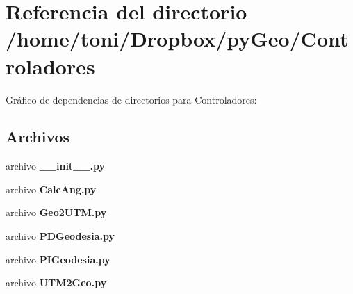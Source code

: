 \section{Referencia del directorio /home/toni/\-Dropbox/py\-Geo/\-Controladores}
\label{dir_acba44bb5996e609b4c608188b0b51d1}
Gráfico de dependencias de directorios para Controladores\-:
\subsection*{Archivos}
\begin{DoxyCompactItemize}
\item 
archivo {\bf \-\_\-\-\_\-init\-\_\-\-\_\-.\-py}
\item 
archivo {\bf Calc\-Ang.\-py}
\item 
archivo {\bf Geo2\-U\-T\-M.\-py}
\item 
archivo {\bf P\-D\-Geodesia.\-py}
\item 
archivo {\bf P\-I\-Geodesia.\-py}
\item 
archivo {\bf U\-T\-M2\-Geo.\-py}
\end{DoxyCompactItemize}
